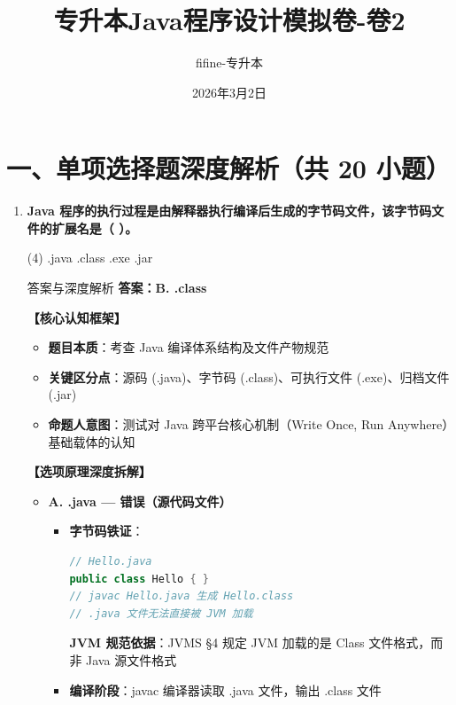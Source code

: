 ﻿\documentclass[12pt, a4paper]{ctexart}
\title{\textcolor{myblue}{\textbf{专升本Java程序设计模拟卷-卷2}}}
\author{fifine-专升本}
\date{2026年3月2日}
\begin{document}
\maketitle
\thispagestyle{empty}
\newpage

\section*{一、单项选择题深度解析（共 20 小题）}

\begin{enumerate}[label=\textbf{\arabic*.}, leftmargin=*, itemsep=1.5em]
	\item \textbf{Java 程序的执行过程是由解释器执行编译后生成的字节码文件，该字节码文件的扩展名是（ \quad ）。}
	      \begin{tasks}(4)
		      \task .java \task .class \task .exe \task .jar
	      \end{tasks}
	      \begin{bluebox}{答案与深度解析}
		      \textbf{答案：B. .class}

		      \textbf{【核心认知框架】}
		      \begin{itemize}[leftmargin=*, nosep]
			      \item \textbf{题目本质}：考查 Java 编译体系结构及文件产物规范
			      \item \textbf{关键区分点}：源码 (.java)、字节码 (.class)、可执行文件 (.exe)、归档文件 (.jar)
			      \item \textbf{命题人意图}：测试对 Java 跨平台核心机制（Write Once, Run Anywhere）基础载体的认知
		      \end{itemize}

		      \textbf{【选项原理深度拆解】}
		      \begin{itemize}[leftmargin=*, nosep]
			      \item \textbf{A. .java — 错误（源代码文件）}
			            \begin{itemize}[leftmargin=*, nosep]
				            \item \textbf{字节码铁证}：
				                  \begin{lstlisting}[language=Java]
// Hello.java
public class Hello { }
// javac Hello.java 生成 Hello.class
// .java 文件无法直接被 JVM 加载
        \end{lstlisting}
				                  \textbf{JVM 规范依据}：JVMS §4 规定 JVM 加载的是 Class 文件格式，而非 Java 源文件格式
				            \item \textbf{编译阶段}：javac 编译器读取 .java 文件，输出 .class 文件
			            \end{itemize}


\end{itemize}
\end{bluebox}
\end{enumerate}
\end{document}
